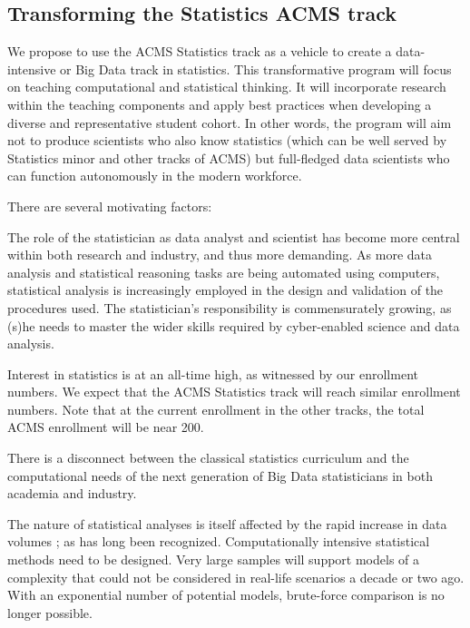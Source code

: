 \subsection{Transforming the Statistics  ACMS track}
We propose to use the ACMS Statistics track as a vehicle to create a
data-intensive or Big Data track in statistics. This transformative
program will focus on teaching computational and statistical thinking.
It will incorporate research within the teaching
components and apply best practices when developing a diverse and
representative student cohort.  In other words, the program will aim not to
produce scientists who also know statistics (which can be well served
by Statistics minor and other tracks of ACMS) but full-fledged
data scientists who can function autonomously in the modern workforce.

There are several motivating factors:
\bit
\item The role of
 the statistician as data analyst and scientist has become more central
 within both research and industry, and thus more demanding.
 As more data analysis and statistical reasoning tasks
 are being automated using computers, statistical analysis is
 increasingly employed in the design and validation of the procedures used.
 The statistician's responsibility is commensurately growing, as (s)he needs
 to master the wider skills required by cyber-enabled science and data
 analysis.
\item Interest in statistics is at an all-time high, as witnessed by
  our enrollment numbers. We expect that the ACMS Statistics track
  will reach similar enrollment numbers. Note that at the current
  enrollment in the other tracks, the total ACMS enrollment will be
  near 200.
\item There is a disconnect between the classical statistics
  curriculum and the computational needs of the next generation of Big
  Data statisticians in both academia and industry.
\item The nature of statistical analyses is itself affected by the
  rapid increase in data volumes \cite{friedman:97}; as has 
  long been recognized. Computationally intensive statistical methods need to
  be designed. Very large samples will support models of a complexity
  that could not be considered in real-life scenarios a decade or two
  ago. 
  With an exponential number of potential models, brute-force comparison
  is no longer possible.
